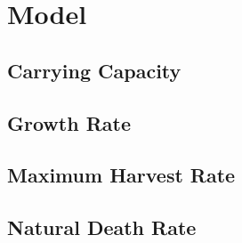\section{Model}
\subsection{Carrying Capacity}
\subsection{Growth Rate}
\subsection{Maximum Harvest Rate}
\subsection{Natural Death Rate}
